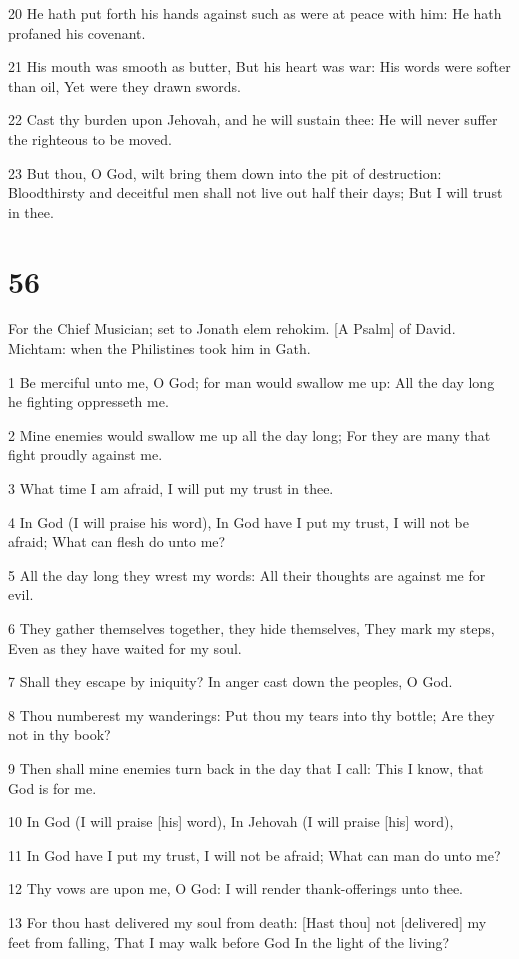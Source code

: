 \par 20 He hath put forth his hands against such as were at peace with him: He hath profaned his covenant.
\par 21 His mouth was smooth as butter, But his heart was war: His words were softer than oil, Yet were they drawn swords.
\par 22 Cast thy burden upon Jehovah, and he will sustain thee: He will never suffer the righteous to be moved.
\par 23 But thou, O God, wilt bring them down into the pit of destruction: Bloodthirsty and deceitful men shall not live out half their days; But I will trust in thee.

\chapter{56}

\par For the Chief Musician; set to Jonath elem rehokim. [A Psalm] of David. Michtam: when the Philistines took him in Gath.

\par 1 Be merciful unto me, O God; for man would swallow me up: All the day long he fighting oppresseth me.
\par 2 Mine enemies would swallow me up all the day long; For they are many that fight proudly against me.
\par 3 What time I am afraid, I will put my trust in thee.
\par 4 In God (I will praise his word), In God have I put my trust, I will not be afraid; What can flesh do unto me?
\par 5 All the day long they wrest my words: All their thoughts are against me for evil.
\par 6 They gather themselves together, they hide themselves, They mark my steps, Even as they have waited for my soul.
\par 7 Shall they escape by iniquity? In anger cast down the peoples, O God.
\par 8 Thou numberest my wanderings: Put thou my tears into thy bottle; Are they not in thy book?
\par 9 Then shall mine enemies turn back in the day that I call: This I know, that God is for me.
\par 10 In God (I will praise [his] word), In Jehovah (I will praise [his] word),
\par 11 In God have I put my trust, I will not be afraid; What can man do unto me?
\par 12 Thy vows are upon me, O God: I will render thank-offerings unto thee.
\par 13 For thou hast delivered my soul from death: [Hast thou] not [delivered] my feet from falling, That I may walk before God In the light of the living?

